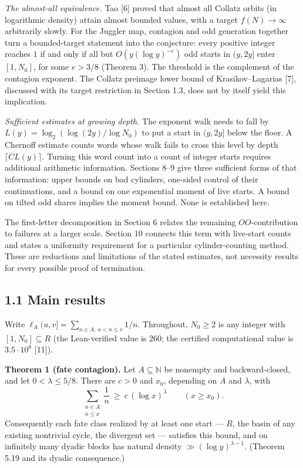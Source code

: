 \documentclass[11pt,a4paper]{article}
\begin{document}
\emph{The almost-all equivalence.} Tao {[}6{]} proved that almost all
Collatz orbits (in logarithmic density) attain almost bounded values,
with a target \(f(N)\to\infty\) arbitrarily slowly. For the Juggler map,
contagion and odd generation together turn a bounded-target statement
into the conjecture: every positive integer reaches \(1\) if and only if
all but \(O(y(\log y)^{-e})\) odd starts in \((y,2y]\) enter
\([1,N_0]\), for some \(e>3/8\) (Theorem 3). The threshold is the
complement of the contagion exponent. The Collatz preimage lower bound
of Krasikov--Lagarias {[}7{]}, discussed with its target restriction in
Section 1.3, does not by itself yield this implication.

\emph{Sufficient estimates at growing depth.} The exponent walk needs to
fall by \(L(y)=\log_2(\log(2y)/\log N_0)\) to put a start in \((y,2y]\)
below the floor. A Chernoff estimate counts words whose walk fails to
cross this level by depth \(\lceil CL(y)\rceil\). Turning this word
count into a count of integer starts requires additional arithmetic
information. Sections 8--9 give three sufficient forms of that
information: upper bounds on bad cylinders, one-sided control of their
continuations, and a bound on one exponential moment of live starts. A
bound on tilted odd shares implies the moment bound. None is established
here.

The first-letter decomposition in Section 6 relates the remaining
\(OO\)-contribution to failures at a larger scale. Section 10 connects
this term with live-start counts and states a uniformity requirement for
a particular cylinder-counting method. These are reductions and
limitations of the stated estimates, not necessity results for every
possible proof of termination.

\subsection{1.1 Main results}\label{main-results}

Write \(\ell_A(u,v]=\sum_{n\in A,\,u<n\le v}1/n\). Throughout,
\(N_0\ge2\) is any integer with \([1,N_0]\subseteq R\) (the
Lean-verified value is \(260\); the certified computational value is
\(3.5\cdot 10^8\) {[}11{]}).

\textbf{Theorem 1 (fate contagion).} Let \(A\subseteq\mathbb N\) be
nonempty and backward-closed, and let \(0<\lambda\le5/8\). There are
\(c>0\) and \(x_0\), depending on \(A\) and \(\lambda\), with \[
\sum_{\substack{n\in A\\ n\le x}}\frac1n\ \ge\ c\,(\log x)^{\lambda}
\qquad(x\ge x_0).
\] Consequently each fate class realized by at least one start ---
\(R\), the basin of any existing nontrivial cycle, the divergent set ---
satisfies this bound, and on infinitely many dyadic blocks has natural
density \(\gg(\log y)^{\lambda-1}\). (Theorem 5.19 and its dyadic
consequence.)
\end{document}
